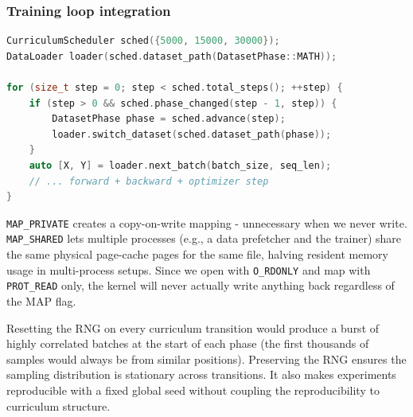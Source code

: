 \documentclass[12pt, a4paper]{article}
\begin{document}
\subsubsection{Training loop integration}

\begin{tcolorbox}[codebox, title={Typical training loop pattern}]
\begin{lstlisting}[language=C++]
CurriculumScheduler sched({5000, 15000, 30000});
DataLoader loader(sched.dataset_path(DatasetPhase::MATH));

for (size_t step = 0; step < sched.total_steps(); ++step) {
    if (step > 0 && sched.phase_changed(step - 1, step)) {
        DatasetPhase phase = sched.advance(step);
        loader.switch_dataset(sched.dataset_path(phase));
    }
    auto [X, Y] = loader.next_batch(batch_size, seq_len);
    // ... forward + backward + optimizer step
}
\end{lstlisting}
\end{tcolorbox}

\begin{tcolorbox}[interviewbox,
    title={Interview: Why use mmap(MAP\_SHARED) for a read-only file?}]
  \texttt{MAP\_PRIVATE} creates a copy-on-write mapping - unnecessary when we
  never write.  \texttt{MAP\_SHARED} lets multiple processes (e.g., a data
  prefetcher and the trainer) share the same physical page-cache pages for the
  same file, halving resident memory usage in multi-process setups.  Since we
  open with \texttt{O\_RDONLY} and map with \texttt{PROT\_READ} only, the kernel
  will never actually write anything back regardless of the MAP flag.
\end{tcolorbox}

\begin{tcolorbox}[interviewbox,
    title={Interview: Why does switch\_dataset() preserve the RNG?}]
  Resetting the RNG on every curriculum transition would produce a burst of
  highly correlated batches at the start of each phase (the first thousands of
  samples would always be from similar positions).  Preserving the RNG ensures
  the sampling distribution is stationary across transitions.  It also makes
  experiments reproducible with a fixed global seed without coupling the
  reproducibility to curriculum structure.
\end{tcolorbox}
\end{document}
